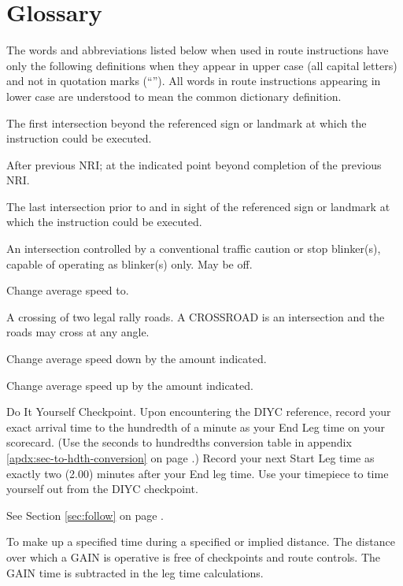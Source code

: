 \section{Glossary}
The words and abbreviations listed below when used in route instructions have only the following definitions when they appear in upper case (all capital letters) and not in quotation marks (``'').  All words in route instructions appearing in lower case are understood to mean the common dictionary definition.

The first intersection beyond the referenced sign or landmark at which the instruction could be executed.

After previous NRI; at the indicated point beyond completion of the previous NRI.

The last intersection prior to and in sight of the referenced sign or landmark at which the instruction could be executed.

An intersection controlled by a conventional traffic caution or stop blinker(s), capable of operating as blinker(s) only.  May be off.

Change average speed to.

A crossing of two legal rally roads.  A CROSSROAD is an intersection and the roads may cross at any angle.

Change average speed down by the amount indicated.

Change average speed up by the amount indicated.

Do It Yourself Checkpoint.  Upon encountering the DIYC reference, record your exact arrival time to the hundredth of a minute as your End Leg time on your scorecard.  (Use the seconds to hundredths conversion table in appendix \ref{apdx:sec-to-hdth-conversion} on page \pageref{apdx:sec-to-hdth-conversion}.)  Record your next Start Leg time as exactly two (2.00) minutes after your End leg time.  Use your timepiece to time yourself out from the DIYC checkpoint.

See Section \ref{sec:follow} on page \pageref{sec:follow}.

To make up a specified time during a specified or implied distance.  The distance over which a GAIN is operative is free of checkpoints and route controls.  The GAIN time is subtracted in the leg time calculations.

